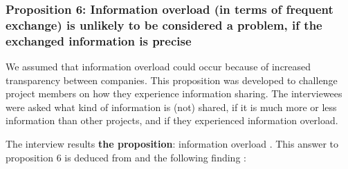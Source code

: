 


\subsubsection{Proposition 6: Information overload (in terms of frequent exchange) is unlikely to be considered a problem, if the exchanged information is precise}


We assumed that information overload could occur because of increased transparency between companies. This proposition was developed to challenge project members on how they experience information sharing. The interviewees were asked what kind of information is (not) shared, if it is much more or less information than other projects, and if they experienced information overload. 



%

The interview results {\bf {} the proposition}: information overload  . This answer to proposition 6 is deduced from  and the following finding :


